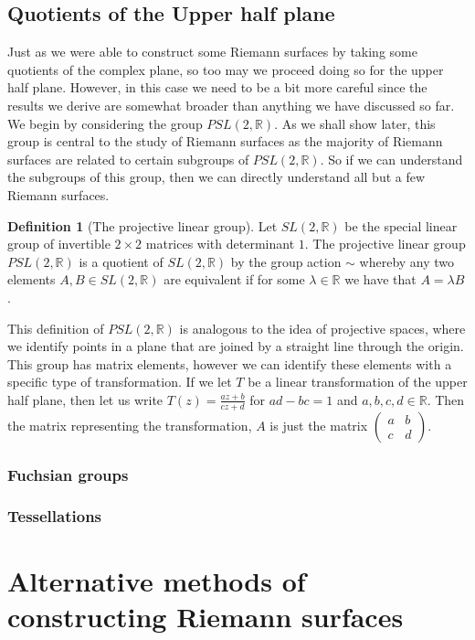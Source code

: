 \documentclass[11pt]{report}
\theoremstyle{definition}
\newtheorem{defn}[thm]{Definition}
\begin{document}
\subsection{Quotients of the Upper half plane}
Just as we were able to construct some Riemann surfaces by taking some quotients of the complex plane, so too may we proceed doing so for the upper half plane. However, in this case we need to be a bit more careful since the results we derive are somewhat broader than anything we have discussed so far. We begin by considering the group $PSL(2,\mathbb{R})$. As we shall show later, this group is central to the study of Riemann surfaces as the majority of Riemann surfaces are related to certain subgroups of $PSL(2,\mathbb{R})$. So if we can understand the subgroups of this group, then we can directly understand all but a few Riemann surfaces.
\begin{defn}[The projective linear group]
  Let $SL(2,\mathbb{R})$ be the special linear group of invertible $2\times 2$ matrices with determinant $1$. The projective linear group $PSL(2,\mathbb{R})$ is a quotient of $SL(2,\mathbb{R})$ by the group action $\sim$ whereby any two elements $A,B \in SL(2,\mathbb{R})$ are equivalent if for some $\lambda \in \mathbb{R}$ we have that $A = \lambda B$.
\end{defn}
This definition of $PSL(2,\mathbb{R})$ is analogous to the idea of projective spaces, where we identify points in a plane that are joined by a straight line through the origin. This group has matrix elements, however we can identify these elements with a specific type of transformation.
If we let $T$ be a linear transformation of the upper half plane, then let us write $T(z) = \frac{az + b}{cz+d}$ for $ad-bc =1$ and $a,b,c,d \in \mathbb{R}$. Then the matrix representing the transformation, $A$ is just the matrix $ \begin{pmatrix}
  a & b \\
  c & d
\end{pmatrix}$.
\subsubsection{Fuchsian groups}
\subsubsection{Tessellations}
\section{Alternative methods of constructing Riemann surfaces}
\end{document}
